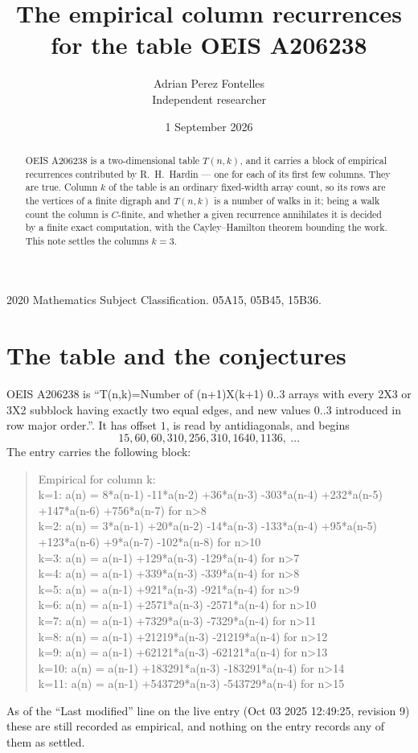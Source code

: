 \documentclass[11pt,a4paper]{article}
\title{The empirical column recurrences for the table OEIS A206238}
\author{Adrian Perez Fontelles\\ \small Independent researcher}
\date{1 September 2026}
\theoremstyle{plain}
\theoremstyle{definition}
\begin{document}
\maketitle

\begin{abstract}
OEIS A206238 is a two-dimensional table $T(n,k)$, and it carries a block of empirical
recurrences contributed by R.~H.~Hardin --- one for each of its first few columns. They are
true. Column $k$ of the table is an ordinary fixed-width array count, so its rows are the
vertices of a finite digraph and $T(n,k)$ is a number of walks in it; being a walk count the
column is $C$-finite, and whether a given recurrence annihilates it is decided by a finite
exact computation, with the Cayley--Hamilton theorem bounding the work. This note settles the columns $k=3$.
\end{abstract}

\noindent\small 2020 Mathematics Subject Classification. 05A15, 05B45, 15B36.\normalsize

\section{The table and the conjectures}

OEIS A206238 is ``T(n,k)=Number of (n+1)X(k+1) 0..3 arrays with every 2X3 or 3X2 subblock having exactly two equal edges, and new values 0..3 introduced in row major order.''. It has offset $1$, is
read by antidiagonals, and begins
\[
15, 60, 60, 310, 256, 310, 1640, 1136,\ \dots
\]
The entry carries the following block:
\begin{quote}\small
Empirical for column k:\\
k=1: a(n) = 8*a(n-1) -11*a(n-2) +36*a(n-3) -303*a(n-4) +232*a(n-5) +147*a(n-6) +756*a(n-7) for n>8\\
k=2: a(n) = 3*a(n-1) +20*a(n-2) -14*a(n-3) -133*a(n-4) +95*a(n-5) +123*a(n-6) +9*a(n-7) -102*a(n-8) for n>10\\
k=3: a(n) = a(n-1) +129*a(n-3) -129*a(n-4) for n>7\\
k=4: a(n) = a(n-1) +339*a(n-3) -339*a(n-4) for n>8\\
k=5: a(n) = a(n-1) +921*a(n-3) -921*a(n-4) for n>9\\
k=6: a(n) = a(n-1) +2571*a(n-3) -2571*a(n-4) for n>10\\
k=7: a(n) = a(n-1) +7329*a(n-3) -7329*a(n-4) for n>11\\
k=8: a(n) = a(n-1) +21219*a(n-3) -21219*a(n-4) for n>12\\
k=9: a(n) = a(n-1) +62121*a(n-3) -62121*a(n-4) for n>13\\
k=10: a(n) = a(n-1) +183291*a(n-3) -183291*a(n-4) for n>14\\
k=11: a(n) = a(n-1) +543729*a(n-3) -543729*a(n-4) for n>15\\
\end{quote}
As of the ``Last modified'' line on the live entry (Oct 03 2025 12:49:25, revision 9) these are still
recorded as empirical, and nothing on the entry records any of them as settled.
\end{document}
